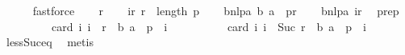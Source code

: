 \begin{isabellebody}
\ \ \ \ \isamarkupfalse%
\ fastforce\isanewline
{}\isamarkupfalse%
\isanewline
\ \ \isamarkupfalse%
\ r\isanewline
\ \ \isamarkupfalse%
\ ir{\isacharcolon}{\kern0pt}\ {\isachardoublequoteopen}r\ {\isacharless}{\kern0pt}\ length\ p{\isachardoublequoteclose}\isanewline
\ \ \isamarkupfalse%
\ bnlpa{\isacharcolon}{\kern0pt}\ {\isachardoublequoteopen}{\isacharparenleft}{\kern0pt}b{\isacharcomma}{\kern0pt}\ a{\isacharparenright}{\kern0pt}\ {\isasymnotin}\ p{\isacharbang}{\kern0pt}r{\isachardoublequoteclose}\isanewline
\ \ \isamarkupfalse%
\ bnlpa\ ir\ \isamarkupfalse%
\ prep{\isacharcolon}{\kern0pt}\ \isanewline
\ \ \ \ \ \ \ \ \ {\isachardoublequoteopen}card\ {\isacharbraceleft}{\kern0pt}i{\isachardot}{\kern0pt}\ i\ {\isacharless}{\kern0pt}\ r\ {\isasymand}\ {\isacharparenleft}{\kern0pt}b{\isacharcomma}{\kern0pt}\ a{\isacharparenright}{\kern0pt}\ {\isasymin}\ p\ {\isacharbang}{\kern0pt}\ i{\isacharbraceright}{\kern0pt}\ \isanewline
\ \ \ \ \ \ \ \ {\isacharequal}{\kern0pt}\ card\ {\isacharbraceleft}{\kern0pt}i{\isachardot}{\kern0pt}\ i\ {\isacharless}{\kern0pt}\ Suc\ r\ {\isasymand}\ {\isacharparenleft}{\kern0pt}b{\isacharcomma}{\kern0pt}\ a{\isacharparenright}{\kern0pt}\ {\isasymin}\ p\ {\isacharbang}{\kern0pt}\ i{\isacharbraceright}{\kern0pt}\ {\isachardoublequoteclose}\isanewline
\ \ \ \ \isamarkupfalse%
\ less{\isacharunderscore}{\kern0pt}Suc{\isacharunderscore}{\kern0pt}eq\ \isamarkupfalse%
\ metis\ \ \ \ \isanewline
{}\isamarkupfalse%
%
\endisatagproof
{\isafoldproof}%
%
\isadelimproof
\ \ \isanewline
%
\endisadelimproof
%
\isadelimtheory
\isanewline
%
\endisadelimtheory
%
\isatagtheory
{}\isamarkupfalse%
%
\endisatagtheory
{\isafoldtheory}%
%
\isadelimtheory
%
\endisadelimtheory
%
\end{isabellebody}%
\endinput
